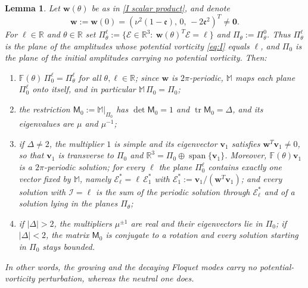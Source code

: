 \documentclass[reqno]{amsart}
\newcommand{\F}{\mathbb{F}}
\newcommand{\ee}{\mathfrak{e}}
\newcommand{\tr}{\operatorname{tr}}     %
\newtheorem{lemma}[theorem]{Lemma}
\begin{document}
\begin{lemma}\label{lem:plane}
Let $\mathbf w(\theta)$ be as in \eqref{I scalar product}, and denote
\[
\mathbf w:=\mathbf w(0)=\left(\nu^{2}(1-\ee),\, 0,\, -2\ee^{2}\right)^T\neq\mathbf 0 .
\]
For $\ell\in\mathbb R$ and $\theta\in\mathbb R$ set $\Pi^\ell_\theta:=\{\boldsymbol{\mathcal E}\in\mathbb R^3:\ \mathbf w(\theta)^T\boldsymbol{\mathcal E}=\ell\}$ and $\Pi_\theta:=\Pi^0_\theta$. Thus $\Pi^\ell_\theta$ is the plane of the amplitudes whose potential vorticity \eqref{eq:I} equals $\ell$, and $\Pi_0$ is the plane of the initial amplitudes carrying no potential vorticity. Then:
\begin{enumerate}
\item[(i)] $\F(\theta)\,\Pi^\ell_0=\Pi^\ell_\theta$ for all $\theta,\ell\in\mathbb R$; since $\mathbf w$ is $2\pi$-periodic, $\mathbb M$ maps each plane $\Pi^\ell_0$ onto itself, and in particular $\mathbb M\,\Pi_0=\Pi_0$;
\item[(ii)] the restriction ${\mathsf M}_0:=\mathbb M|_{\Pi_0}$ has $\det{\mathsf M}_0=1$ and $\tr{\mathsf M}_0=\Delta$, and its eigenvalues are $\mu$ and $\mu^{-1}$;
\item[(iii)] if $\Delta\neq2$, the multiplier $1$ is simple and its eigenvector $\mathbf v_1$ satisfies $\mathbf w^{T}\mathbf v_1\neq0$, so that $\mathbf v_1$ is transverse to $\Pi_0$ and $\mathbb R^{3}=\Pi_0\oplus\operatorname{span}\{\mathbf v_1\}$. Moreover, $\F(\theta)\mathbf v_1$ is a $2\pi$-periodic solution; for every $\ell$ the plane $\Pi^\ell_0$ contains exactly one vector fixed by $\mathbb M$, namely $\boldsymbol{\mathcal E}^*_\ell=\ell\,\boldsymbol{\mathcal E}^*_1$ with $\boldsymbol{\mathcal E}^*_1:=\mathbf v_1/(\mathbf w^T\mathbf v_1)$; and every solution with $\mathcal I=\ell$ is the sum of the periodic solution through $\boldsymbol{\mathcal E}^*_\ell$ and of a solution lying in the planes $\Pi_\theta$;
\item[(iv)] if $|\Delta|>2$, the multipliers $\mu^{\pm1}$ are real and their eigenvectors lie in $\Pi_0$; if $|\Delta|<2$, the matrix ${\mathsf M}_0$ is conjugate to a rotation and every solution starting in $\Pi_0$ stays bounded.
\end{enumerate}
In other words, the growing and the decaying Floquet modes carry no potential-vorticity perturbation, whereas the neutral one does.
\end{lemma}
\end{document}
